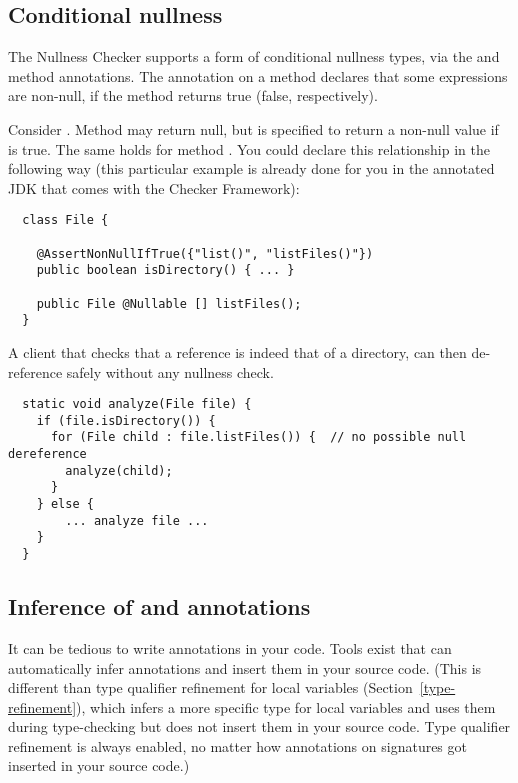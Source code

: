 \subsection{Conditional nullness\label{conditional-nullness}}

The Nullness Checker supports a form of conditional nullness types, via the
 and  method annotations.
The annotation on a method declares that some expressions are non-null, if
the method returns true (false, respectively).

Consider .
Method
 may
return null, but is specified to return a non-null value if
 is
true.  The same holds for method
.
You could declare this relationship in the following way (this particular
example is already
done for you in the annotated JDK that comes with the Checker Framework):

\begin{Verbatim}
  class File {

    @AssertNonNullIfTrue({"list()", "listFiles()"})
    public boolean isDirectory() { ... }

    public File @Nullable [] listFiles();
  }
\end{Verbatim}

A client that checks that a  reference is indeed that of a directory,
can then de-reference  safely without any nullness check.

\begin{Verbatim}
  static void analyze(File file) {
    if (file.isDirectory()) {
      for (File child : file.listFiles()) {  // no possible null dereference
        analyze(child);
      }
    } else {
        ... analyze file ...
    }
  }
\end{Verbatim}


\subsection{Inference of  and  annotations\label{nullness-inference}}

It can be tedious to write annotations in your code.  Tools exist that
can automatically infer annotations and insert them in your source code.
(This is different than type qualifier refinement for local variables
(Section~\ref{type-refinement}), which infers a more specific type for
local variables and uses them during type-checking but does not insert them
in your source code.  Type qualifier refinement is always enabled, no
matter how annotations on signatures got inserted in your source code.)

